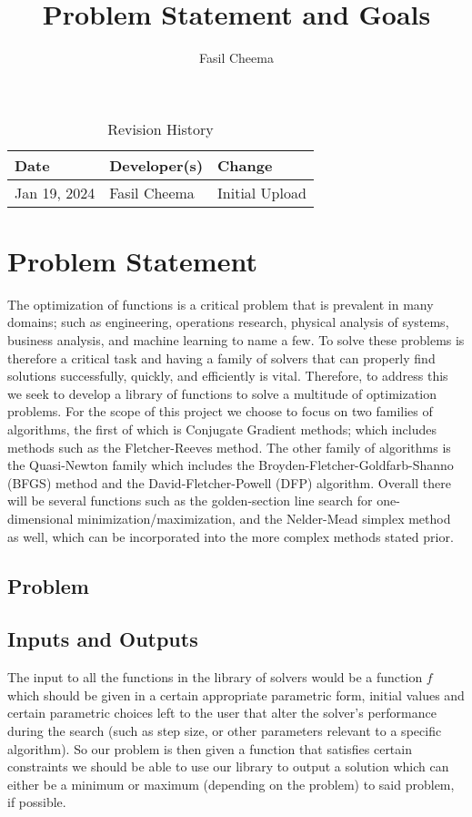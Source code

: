 \documentclass{article}
\title{Problem Statement and Goals\\\progname}
\author{Fasil Cheema}
\begin{document}
\maketitle

\begin{table}[hp]
\caption{Revision History} \label{TblRevisionHistory}
\begin{tabularx}{\textwidth}{llX}
\toprule
\textbf{Date} & \textbf{Developer(s)} & \textbf{Change}\\
\midrule
Jan 19, 2024 & Fasil Cheema & Initial Upload\\
\bottomrule
\end{tabularx}
\end{table}

\section{Problem Statement}

The optimization of functions is a critical problem that is prevalent in many domains; such as engineering, operations research, physical analysis of systems, business analysis, and machine learning to name a few. To solve these problems is therefore a critical task and having a family of solvers that can properly find solutions successfully, quickly, and efficiently is vital. Therefore, to address this we seek to develop a library of functions to solve a multitude of optimization problems. For the scope of this project we choose to focus on two families of algorithms, the first of which is Conjugate Gradient methods; which includes methods such as the Fletcher-Reeves method. The other family of algorithms is the Quasi-Newton family which includes the Broyden-Fletcher-Goldfarb-Shanno (BFGS) method and the David-Fletcher-Powell (DFP) algorithm. Overall there will be several functions such as the golden-section line search for one-dimensional minimization/maximization, and the Nelder-Mead simplex method as well, which can be incorporated into the more complex methods stated prior.
\\

\subsection{Problem}

\subsection{Inputs and Outputs}
The input to all the functions in the library of solvers would be a function $f$ which should be given in a certain appropriate parametric form, initial values and certain parametric choices left to the user that alter the solver's performance during the search (such as step size, or other parameters relevant to a specific algorithm).  So our problem is then given a function that satisfies certain constraints we should be able to use our library to output a solution which can either be a minimum or maximum (depending on the problem) to said problem, if possible.
\\
\end{document}

